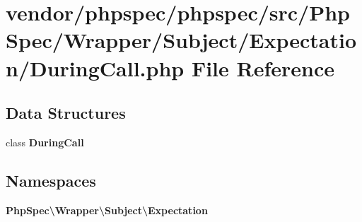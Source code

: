 \section{vendor/phpspec/phpspec/src/\+Php\+Spec/\+Wrapper/\+Subject/\+Expectation/\+During\+Call.php File Reference}
\label{_during_call_8php}
\subsection*{Data Structures}
\begin{DoxyCompactItemize}
\item 
class {\bf During\+Call}
\end{DoxyCompactItemize}
\subsection*{Namespaces}
\begin{DoxyCompactItemize}
\item 
 {\bf Php\+Spec\textbackslash{}\+Wrapper\textbackslash{}\+Subject\textbackslash{}\+Expectation}
\end{DoxyCompactItemize}

